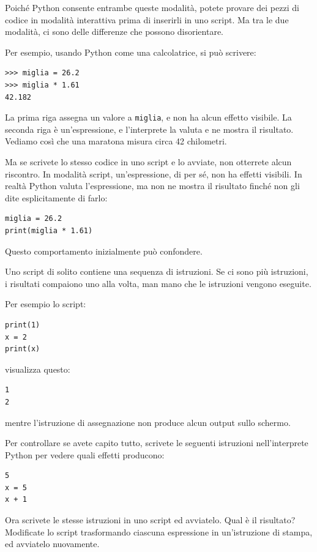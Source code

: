 \documentclass[10pt]{book}
\begin{document}
Poiché Python consente entrambe queste modalità, potete provare dei pezzi di codice in modalità interattiva prima di inserirli in uno script. Ma tra le due modalità, ci sono delle differenze che possono disorientare.

Per esempio, usando Python come una calcolatrice, si può scrivere:

\begin{verbatim}
>>> miglia = 26.2
>>> miglia * 1.61
42.182
\end{verbatim}

La prima riga assegna un valore a {\tt miglia}, e non ha alcun effetto visibile. La seconda riga è un'espressione, e l'interprete la valuta e ne mostra il risultato. Vediamo così che una maratona misura circa 42 chilometri.

Ma se scrivete lo stesso codice in uno script e lo avviate, non otterrete alcun riscontro. In modalità script, un'espressione, di per sé, non ha effetti visibili. In realtà Python valuta l'espressione, ma non ne mostra il risultato finché non gli dite esplicitamente di farlo:

\begin{verbatim}
miglia = 26.2
print(miglia * 1.61)
\end{verbatim}

Questo comportamento inizialmente può confondere.

Uno script di solito contiene una sequenza di istruzioni. Se ci sono più istruzioni, i risultati compaiono uno alla volta, man mano che le istruzioni vengono eseguite.

Per esempio lo script:

\begin{verbatim}
print(1)
x = 2
print(x)
\end{verbatim}
%
visualizza questo:

\begin{verbatim}
1
2
\end{verbatim}
%
mentre l'istruzione di assegnazione non produce alcun output sullo schermo.

Per controllare se avete capito tutto, scrivete le seguenti istruzioni nell'interprete Python per vedere quali effetti producono:

\begin{verbatim}
5
x = 5
x + 1
\end{verbatim}
%
Ora scrivete le stesse istruzioni in uno script ed avviatelo. Qual è il risultato? Modificate lo script trasformando ciascuna espressione in un'istruzione di stampa, ed avviatelo nuovamente.
\end{document}
